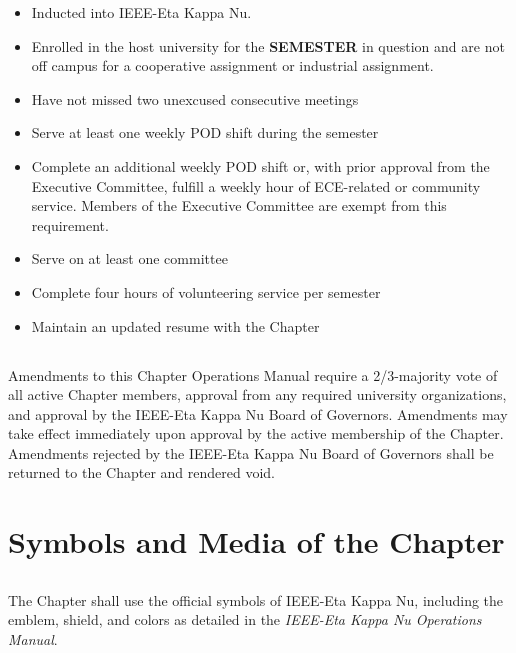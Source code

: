 \documentclass[10pt, oneside]{article}
\begin{document}
\begin{itemize}
    \item Inducted into IEEE-Eta Kappa Nu.
    \item Enrolled in the host university for the \textbf{SEMESTER} in question and are not off campus for a cooperative assignment or industrial assignment.
    \item Have not missed two unexcused consecutive meetings
    \item Serve at least one weekly POD shift during the semester
    \item Complete an additional weekly POD shift or, with prior approval from the Executive Committee, fulfill a weekly hour of ECE-related or community service. Members of the Executive Committee are exempt from this requirement.

    \item Serve on at least one committee
    \item Complete four hours of volunteering service per semester
    \item Maintain an updated resume with the Chapter
\end{itemize}

\subsection{}
Amendments to this Chapter Operations Manual require a 2/3-majority vote of all active Chapter members, approval from any required university organizations, and approval by the IEEE-Eta Kappa Nu Board of Governors. Amendments may take effect immediately upon approval by the active membership of the Chapter. Amendments rejected by the IEEE-Eta Kappa Nu Board of Governors shall be returned to the Chapter and rendered void.

\section{Symbols and Media of the Chapter}
\subsection{}

The Chapter shall use the official symbols of IEEE-Eta Kappa Nu, including the emblem, shield, and colors as detailed in the \textit{IEEE-Eta Kappa Nu Operations Manual}.

\subsection{}
\end{document}
